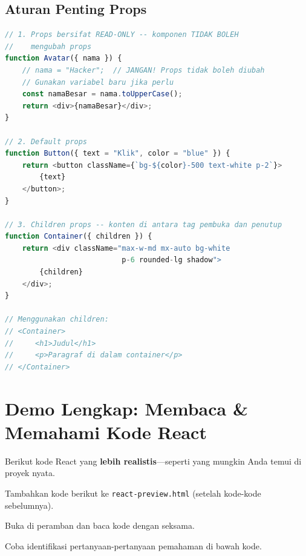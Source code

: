 \subsection{Aturan Penting Props}

\begin{lstlisting}[language=JavaScript, caption={Aturan \emph{props}: read-only, default, dan children}, label={lst:13-props-aturan}]
// 1. Props bersifat READ-ONLY -- komponen TIDAK BOLEH
//    mengubah props
function Avatar({ nama }) {
    // nama = "Hacker";  // JANGAN! Props tidak boleh diubah
    // Gunakan variabel baru jika perlu
    const namaBesar = nama.toUpperCase();
    return <div>{namaBesar}</div>;
}

// 2. Default props
function Button({ text = "Klik", color = "blue" }) {
    return <button className={`bg-${color}-500 text-white p-2`}>
        {text}
    </button>;
}

// 3. Children props -- konten di antara tag pembuka dan penutup
function Container({ children }) {
    return <div className="max-w-md mx-auto bg-white
                           p-6 rounded-lg shadow">
        {children}
    </div>;
}

// Menggunakan children:
// <Container>
//     <h1>Judul</h1>
//     <p>Paragraf di dalam container</p>
// </Container>
\end{lstlisting}

\section{Demo Lengkap: Membaca \& Memahami Kode React}
\label{sec:13-demo-lengkap}

Berikut kode React yang \textbf{lebih realistis}---seperti yang mungkin Anda temui di proyek nyata.

\begin{langkah}
  \item Tambahkan kode berikut ke \texttt{react-preview.html} (setelah kode-kode sebelumnya).
  \item Buka di peramban dan baca kode dengan seksama.
  \item Coba identifikasi pertanyaan-pertanyaan pemahaman di bawah kode.
\end{langkah}

